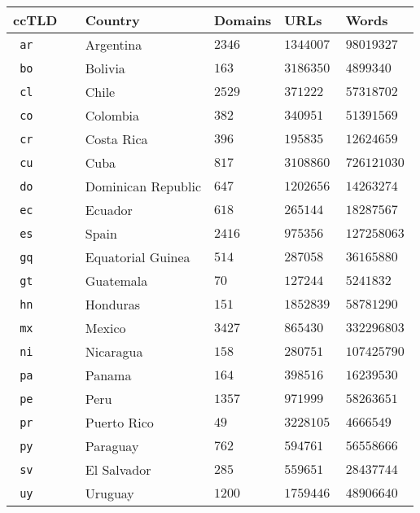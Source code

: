 \begin{tabular}{ll R{0.7in}R{1in}R{1in}}
\textbf{ccTLD}~~ & \textbf{Country} & \textbf{Domains} & \textbf{URLs} & \textbf{Words} \\
\hline
\Tstrut\texttt{~ar} & Argentina &  $\SI{2346}{}$ & $\SI{1344007}{}$ & $\SI{98019327}{}$ \\
\texttt{~bo} & Bolivia &  $\SI{163}{}$ & $\SI{3186350}{}$ & $\SI{4899340}{}$ \\
\texttt{~cl} & Chile &  $\SI{2529}{}$ & $\SI{371222}{}$ & $\SI{57318702}{}$ \\
\texttt{~co} & Colombia &  $\SI{382}{}$ & $\SI{340951}{}$ & $\SI{51391569}{}$ \\
\texttt{~cr} & Costa Rica &  $\SI{396}{}$ & $\SI{195835}{}$ & $\SI{12624659}{}$ \\
\texttt{~cu} & Cuba &  $\SI{817}{}$ & $\SI{3108860}{}$ & $\SI{726121030}{}$ \\
\texttt{~do} & Dominican Republic &  $\SI{647}{}$ & $\SI{1202656}{}$ & $\SI{14263274}{}$ \\
\texttt{~ec} & Ecuador &  $\SI{618}{}$ & $\SI{265144}{}$ & $\SI{18287567}{}$ \\
\texttt{~es} & Spain &  $\SI{2416}{}$ & $\SI{975356}{}$ & $\SI{127258063}{}$ \\
\texttt{~gq} & Equatorial Guinea &  $\SI{514}{}$ & $\SI{287058}{}$ & $\SI{36165880}{}$ \\
\texttt{~gt} & Guatemala &  $\SI{70}{}$ & $\SI{127244}{}$ & $\SI{5241832}{}$ \\
\texttt{~hn} & Honduras &  $\SI{151}{}$ & $\SI{1852839}{}$ & $\SI{58781290}{}$ \\
\texttt{~mx} & Mexico &  $\SI{3427}{}$ & $\SI{865430}{}$ & $\SI{332296803}{}$ \\
\texttt{~ni} & Nicaragua &  $\SI{158}{}$ & $\SI{280751}{}$ & $\SI{107425790}{}$ \\
\texttt{~pa} & Panama &  $\SI{164}{}$ & $\SI{398516}{}$ & $\SI{16239530}{}$ \\
\texttt{~pe} & Peru &  $\SI{1357}{}$ & $\SI{971999}{}$ & $\SI{58263651}{}$ \\
\texttt{~pr} & Puerto Rico &  $\SI{49}{}$ & $\SI{3228105}{}$ & $\SI{4666549}{}$ \\
\texttt{~py} & Paraguay &  $\SI{762}{}$ & $\SI{594761}{}$ & $\SI{56558666}{}$ \\
\texttt{~sv} & El Salvador &  $\SI{285}{}$ & $\SI{559651}{}$ & $\SI{28437744}{}$ \\
\texttt{~uy} & Uruguay &  $\SI{1200}{}$ & $\SI{1759446}{}$ & $\SI{48906640}{}$ \\

\end{tabular}
